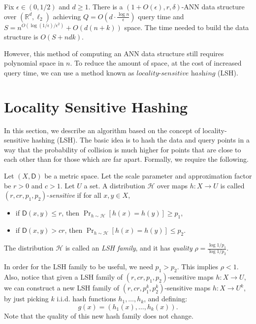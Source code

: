 \begin{theorem}
Fix $\epsilon \in (0,1/2)$ and $d \geq 1$. There is a $(1 + O(\epsilon),r, \delta)$-ANN data structure over $(\mathbb{R}^d, \ell_2)$ achieving $Q = O(d \cdot \frac{\log n}{\epsilon})$ query time and $S = n^{O(\log (1 / \epsilon)/\epsilon^2)} + O(d (n + k))$ space. The time needed to build the data structure is $O(S + ndk)$.
\end{theorem}

However, this method of computing an ANN data structure still requires polynomial space in $n$. To reduce the amount of space,
at the cost of increased query time, we can use a method known as $\textit{locality-sensitive hashing}$ (LSH).

\section{Locality Sensitive Hashing}

In this section, we describe an algorithm based on the concept of locality-sensitive hashing (LSH). The
basic idea is to hash the data and query points in a way that the probability of collision is much higher for
points that are close to each other than for those which are far apart. Formally, we require the following.

\begin{definition}
Let $(X, \mathsf{D})$ be a metric space. Let the scale parameter and approximation factor be $r > 0$ and $c > 1$. Let $U$ a set. A distribution $\mathcal{H}$ over maps $h: X \to U$ is called $(r, cr, p_1,p_2)$-\emph{sensitive} if for all $x, y \in X$,
\begin{itemize}
    \item if $\mathsf{D}(x,y) \leq r$, then $\Pr_{h \sim \mathcal{H}}\left[ h(x) = h(y) \right] \geq p_1$,
    \item if $\mathsf{D}(x,y) > cr$, then $\Pr_{h \sim \mathcal{H}} \left[ h(x) = h(y) \right] \leq p_2$.
\end{itemize}
The distribution $\mathcal{H}$ is called an \emph{LSH family}, and it has \emph{quality} $\rho = \frac{\log 1/p_1}{\log 1/p_2}$.
\end{definition}

In order for the LSH family to be useful, we need $p_1 > p_2$. This implies $\rho < 1$. Also, notice that given a LSH family of $(r,cr,p_1,p_2)$-sensitive maps $h: X \to U$, we can construct a new LSH family of $(r,cr,p_1^k, p_2^k)$-sensitive maps $h : X \to U^k$, by just picking $k$ i.i.d. hash functions $h_1,\dotsc, h_k$, and defining:
\[g(x) = (h_1(x),\dotsc, h_k(x)).\]
Note that the quality of this new hash family does not change. \\

